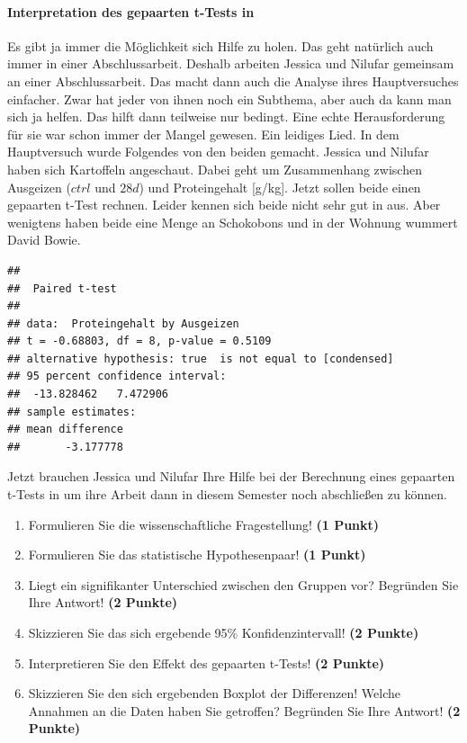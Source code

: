 \documentclass[a4paper, 9pt]{scrartcl}\usepackage[]{graphicx}\usepackage[]{xcolor}
\makeatletter
\newenvironment{kframe}{%
 \def\at@end@of@kframe{}%
 \ifinner\ifhmode%
  \def\at@end@of@kframe{\end{minipage}}%
  \begin{minipage}{\columnwidth}%
 \fi\fi%
 \def\FrameCommand##1{\hskip\@totalleftmargin \hskip-\fboxsep
 \colorbox{shadecolor}{##1}\hskip-\fboxsep
     \hskip-\linewidth \hskip-\@totalleftmargin \hskip\columnwidth}%
 \MakeFramed {\advance\hsize-\width
   \@totalleftmargin\z@ \linewidth\hsize
   \@setminipage}}%
 {\par\unskip\endMakeFramed%
 \at@end@of@kframe}
\newenvironment{knitrout}{}{} %
\makeatother
\begin{document}
\paragraph{Interpretation des gepaarten t-Tests in \Rlogo}

Es gibt ja immer die Möglichkeit sich Hilfe zu holen. Das geht natürlich auch immer in einer Abschlussarbeit. Deshalb arbeiten Jessica und Nilufar gemeinsam an einer Abschlussarbeit. Das macht dann auch die Analyse ihres Hauptversuches einfacher. Zwar hat jeder von ihnen noch ein Subthema, aber auch da kann man sich ja helfen. Das hilft dann teilweise nur bedingt. Eine echte Herausforderung für sie war schon immer der Mangel gewesen. Ein leidiges Lied. In dem Hauptversuch wurde Folgendes von den beiden gemacht. Jessica und Nilufar haben sich Kartoffeln angeschaut. Dabei geht um Zusammenhang zwischen Ausgeizen ($ctrl$ und $28d$) und Proteingehalt [g/kg]. Jetzt sollen beide einen gepaarten t-Test rechnen. Leider kennen sich beide nicht sehr gut in \Rlogo aus. Aber wenigtens haben beide eine Menge an Schokobons und in der Wohnung wummert David Bowie.

\begin{knitrout}
\color{fgcolor}\begin{kframe}
\begin{verbatim}
## 
## 	Paired t-test
## 
## data:  Proteingehalt by Ausgeizen
## t = -0.68803, df = 8, p-value = 0.5109
## alternative hypothesis: true  is not equal to [condensed]
## 95 percent confidence interval:
##  -13.828462   7.472906
## sample estimates:
## mean difference 
##       -3.177778
\end{verbatim}
\end{kframe}
\end{knitrout}

Jetzt brauchen Jessica und Nilufar Ihre Hilfe bei der Berechnung eines gepaarten t-Tests in \Rlogo um ihre Arbeit dann in diesem Semester noch abschließen zu können.

\begin{enumerate}
  \item Formulieren Sie die wissenschaftliche Fragestellung! \textbf{(1 Punkt)}
  \item Formulieren Sie das statistische Hypothesenpaar! \textbf{(1 Punkt)}
\item Liegt ein signifikanter Unterschied zwischen den Gruppen vor?
  Begründen Sie Ihre Antwort! \textbf{(2 Punkte)}
\item Skizzieren Sie das sich ergebende 95\% Konfidenzintervall! \textbf{(2 Punkte)}
\item Interpretieren Sie den Effekt des gepaarten t-Tests! \textbf{(2 Punkte)}
\item Skizzieren Sie den sich ergebenden Boxplot der Differenzen! Welche Annahmen an die Daten haben Sie getroffen? Begründen Sie Ihre Antwort! \textbf{(2 Punkte)} 
\end{enumerate}
 
\end{document}
